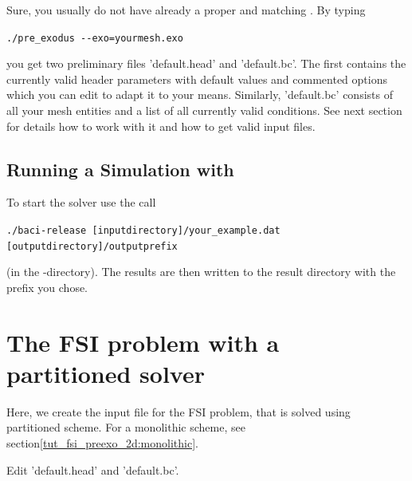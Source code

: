 Sure, you usually do not have already a proper \head and matching \bc. By
typing
\begin{center}
  \verb|./pre_exodus --exo=yourmesh.exo|
\end{center}
you get two preliminary files
'default.head' and 'default.bc'. The first contains the currently valid header
parameters with default values and commented options which you can edit to
adapt it to your means. Similarly, 'default.bc' consists of all your mesh
entities and a list of all currently valid conditions. See next section for
details how to work with it and how to get valid input files.

\subsection{Running a Simulation with \baci{}}
\label{tut_fsi_preexo_2d:baci}
To start the solver use the call 
\begin{center}
	\verb|./baci-release [inputdirectory]/your_example.dat [outputdirectory]/outputprefix|
\end{center}
(in the \baci{}-directory). The results are then written to
the result directory with the prefix you chose.

\section{The FSI problem with a partitioned solver}
Here, we create the \baci{} input file for the FSI problem, that is solved using
partitioned scheme. For a monolithic scheme, see
section\ref{tut_fsi_preexo_2d:monolithic}.

Edit 'default.head' and 'default.bc'.

